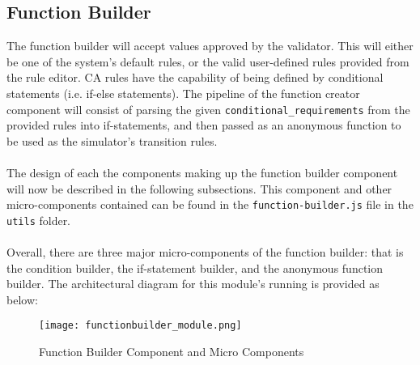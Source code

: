 \subsection{Function Builder} \label{f_builder}
The function builder will accept values approved by the validator. This will either be one of the system's default rules, or the valid user-defined rules provided from the rule editor. CA rules have the capability of being defined by conditional statements (i.e. if-else statements). The pipeline of the function creator component will consist of parsing the given \texttt{conditional\_requirements} from the provided rules into if-statements, and then passed as an anonymous function to be used as the simulator's transition rules. 
\\ \\
The design of each the components making up the function builder component will now be described in the following subsections. This component and other micro-components contained can be found in the \texttt{function-builder.js} file in the \texttt{utils} folder. 
\\ \\
Overall, there are three major micro-components of the function builder: that is the condition builder, the if-statement builder, and the anonymous function builder. The architectural diagram for this module's running is provided as below:
\\
\begin{figure}[H]
    \caption{Function Builder Component and Micro Components}
    \centering
    \texttt{[image: functionbuilder\_module.png]}
\end{figure}
